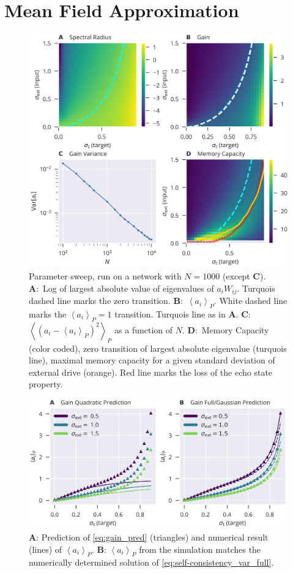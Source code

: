 \documentclass[10pt,a4paper]{article}
\newcommand{\avgp}[1]{\left< #1 \right>_P}
\begin{document}
\section{Mean Field Approximation}

\begin{figure}[t]
	\centering
	\includegraphics[width=\textwidth]{../plots/std_in_std_target_sweep_fig.png}
	\caption{Parameter sweep, run on a network with $N=1000$ (except {\bf C}). {\bf A}:~Log of largest absolute value of eigenvalues of $a_i W_{ij}$. Turquois dashed line marks the zero transition. {\bf B}:~$\avgp{a_i}$.  White dashed line marks the $\avgp{a_i} = 1$ transition. Turquois line as in {\bf A}. {\bf C}:~$\avgp{(a_i - \avgp{a_i})^2}$ as a function of $N$. {\bf D}:~Memory Capacity (color coded), zero transition of largest absolute eigenvalue (turquois line), maximal memory capacity for a given standard deviation of external drive (orange). Red line marks the loss of the echo state property.}
	\label{fig:gain_std_in_std_targ_sweep}
\end{figure}

\begin{figure}[t]
	\centering
	\includegraphics[width=\textwidth]{../plots/std_in_std_target_sweep_fig_cut.png}
	\caption{{\bf A}: Prediction of \eqref{eq:gain_pred} (triangles) and numerical result (lines) of $\avgp{a_i}$. {\bf B}: $\avgp{a_i}$ from the simulation matches the numerically determined solution of \eqref{eq:self-consistency_var_full}.}
\end{figure}
\end{document}
